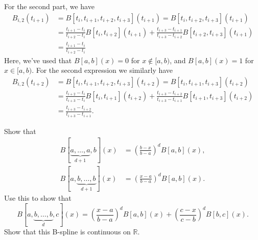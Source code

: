 \begin{solution}
    For the second part, we have
    \begin{align*}
        B_{i, 2}(t_{i+1}) &= B[t_i, t_{i+1}, t_{i+2}, t_{i+3}](t_{i+1}) = B[t_i, t_{i+2}, t_{i+3}](t_{i+1}) \\
        &= \frac{t_{i+1} - t_i}{t_{i+2} - t_i} B[t_i, t_{i+2}](t_{i+1}) + \frac{t_{i+3} - t_{i+1}}{t_{i+3} - t_{i+2}} B[t_{i+2}, t_{i+3}](t_{i+1}) \\
        &= \frac{t_{i+1} - t_i}{t_{i+2} - t_i}
    \end{align*}
    Here, we've used that $B[a, b](x) = 0$ for $x \notin [a, b)$, and $B[a, b](x) = 1$ for $x \in [a, b)$. %
    For the second expression we similarly have
    \begin{align*}
        B_{i, 2}(t_{i+2}) &= B[t_i, t_{i+1}, t_{i+2}, t_{i+3}](t_{i+2}) = B[t_i, t_{i+1}, t_{i+3}](t_{i+2}) \\
        &= \frac{t_{i+2} - t_i}{t_{i+3} - t_i} B[t_i, t_{i+1}](t_{i+2}) + \frac{t_{i+3} - t_{i+2}}{t_{i+3} - t_{i+1}} B[t_{i+1}, t_{i+3}](t_{i+2}) \\
        &= \frac{t_{i+3} - t_{i+2}}{t_{i+3} - t_{i+1}}.
    \end{align*}
\end{solution}

\begin{exercise}
    Show that
    \begin{align*}
        B[\underbrace{a, \ldots, a}_{d+1}, b](x) &= \left(\frac{b - x}{b - a}\right)^d B[a, b](x), \\
        B[a, \underbrace{b, \ldots, b}_{d+1}](x) &= \left(\frac{x - a}{b - a}\right)^d B[a, b](x).
    \end{align*}
    Use this to show that
    \begin{equation*}
        B[a, \underbrace{b, \ldots, b}_{d}, c](x) = \left(\frac{x - a}{b - a}\right)^d B[a, b](x) + \left(\frac{c - x}{c - b}\right)^d B[b, c](x).
    \end{equation*}
    Show that this B-spline is continuous on $\mathbb{R}$.
\end{exercise}

